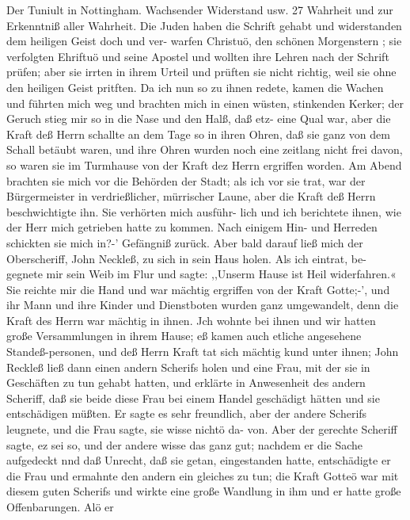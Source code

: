 Der Tuniult in Nottingham. Wachsender Widerstand usw. 27
Wahrheit und zur Erkenntniß aller Wahrheit. Die Juden haben
die Schrift gehabt und widerstanden dem heiligen Geist doch und ver-
warfen Christuö, den schönen Morgenstern ; sie verfolgten Ehriftuö
und seine Apostel und wollten ihre Lehren nach der Schrift prüfen;
aber sie irrten in ihrem Urteil und prüften sie nicht richtig, weil
sie ohne den heiligen Geist pritften. Da ich nun so zu ihnen
redete, kamen die Wachen und führten mich weg und brachten
mich in einen wüsten, stinkenden Kerker; der Geruch stieg mir so
in die Nase und den Halß, daß etz- eine Qual war, aber die
Kraft deß Herrn schallte an dem Tage so in ihren Ohren, daß
sie ganz von dem Schall betäubt waren, und ihre Ohren wurden
noch eine zeitlang nicht frei davon, so waren sie im Turmhause
von der Kraft dez Herrn ergriffen worden. Am Abend brachten
sie mich vor die Behörden der Stadt; als ich vor sie trat, war
der Bürgermeister in verdrießlicher, mürrischer Laune, aber die
Kraft deß Herrn beschwichtigte ihn. Sie verhörten mich ausführ-
lich und ich berichtete ihnen, wie der Herr mich getrieben hatte
zu kommen. Nach einigem Hin- und Herreden schickten sie mich
in?-’ Gefängniß zurück. Aber bald darauf ließ mich der Oberscheriff,
John Neckleß, zu sich in sein Haus holen. Als ich eintrat, be-
gegnete mir sein Weib im Flur und sagte: ,,Unserm Hause ist
Heil widerfahren.« Sie reichte mir die Hand und war mächtig
ergriffen von der Kraft Gotte;-’, und ihr Mann und ihre Kinder
und Dienstboten wurden ganz umgewandelt, denn die Kraft des
Herrn war mächtig in ihnen. Jch wohnte bei ihnen und wir
hatten große Versammlungen in ihrem Hause; eß kamen auch
etliche angesehene Standeß-personen, und deß Herrn Kraft tat sich
mächtig kund unter ihnen; John Reckleß ließ dann einen andern
Scherifs holen und eine Frau, mit der sie in Geschäften zu tun
gehabt hatten, und erklärte in Anwesenheit des andern Scheriff,
daß sie beide diese Frau bei einem Handel geschädigt hätten und
sie entschädigen müßten. Er sagte es sehr freundlich, aber der
andere Scherifs leugnete, und die Frau sagte, sie wisse nichtö da-
von. Aber der gerechte Scheriff sagte, ez sei so, und der andere
wisse das ganz gut; nachdem er die Sache aufgedeckt nnd daß
Unrecht, daß sie getan, eingestanden hatte, entschädigte er die
Frau und ermahnte den andern ein gleiches zu tun; die Kraft
Gotteö war mit diesem guten Scherifs und wirkte eine große
Wandlung in ihm und er hatte große Offenbarungen. Alö er


